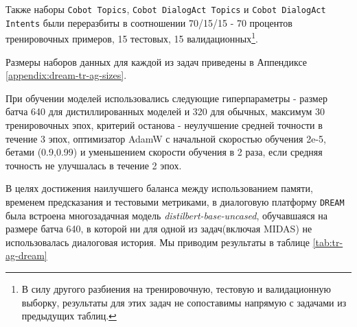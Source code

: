 Также наборы \texttt{Cobot Topics}, \texttt{Cobot DialogAct Topics} и \texttt{Cobot DialogAct Intents} были переразбиты в соотношении 70/15/15 - 70 процентов тренировочных примеров, 15 тестовых, 15 валидационных\footnote{В силу другого разбиения на тренировочную, тестовую и валидационную выборку, результаты для этих задач не сопоставимы напрямую с задачами из предыдущих таблиц.}.

Размеры наборов данных для каждой из задач приведены в Аппендиксе \ref{appendix:dream-tr-ag-sizes}. 

При обучении моделей использовались следующие гиперпараметры - размер батча 640 для дистиллированных моделей и 320 для обычных, максимум 30 тренировочных эпох, критерий останова - неулучшение средней точности в течение 3 эпох, оптимизатор AdamW с начальной скоростью обучения 2e-5, бетами (0.9,0.99) и уменьшением скорости обучения в 2 раза, если средняя точность не улучшалась в течение 2 эпох. 

В целях достижения наилучшего баланса между использованием памяти, временем предсказания и тестовыми метриками, в диалоговую платформу \texttt{DREAM} была встроена многозадачная модель \textit{distilbert-base-uncased}, обучавшаяся на размере батча 640, в которой ни для одной из задач(включая MIDAS) не использовалась диалоговая история.
Мы приводим результаты в таблице \ref{tab:tr-ag-dream} 

